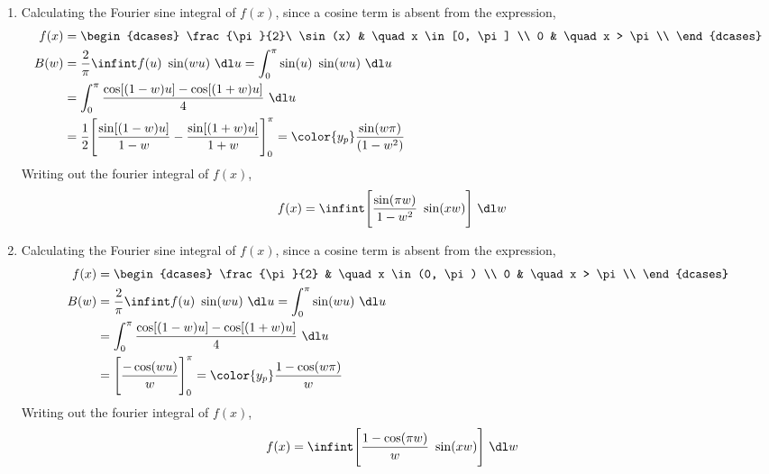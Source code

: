 \begin{enumerate}
    \item Calculating the Fourier sine integral of $ f(x) $, since a cosine term is
          absent from the expression,
          \begin{align}
              f(x) & = \begin{dcases}
                           \frac{\pi}{2}\ \sin(x) & \quad x \in [0, \pi] \\
                           0                      & \quad x > \pi        \\
                       \end{dcases}               \\
              B(w) & = \frac{2}{\pi} \infint f(u)\ \sin(wu)\ \dl u
              = \int_{0}^{\pi} \sin(u)\ \sin(wu)\ \dl u                            \\
                   & = \int_{0}^{\pi} \frac{\cos[(1-w)u] - \cos[(1+w)u]}{4}\ \dl u \\
                   & = \frac{1}{2} \Bigg[ \frac{\sin[(1-w)u]}{1-w}
                  - \frac{\sin[(1+w)u]}{1+w} \Bigg]_0^\pi
              = \color{y_p} \frac{\sin(w\pi)}{(1-w^2)}
          \end{align}
          Writing out the fourier integral of $ f(x) $,
          \begin{align}
              f(x) & = \infint \Bigg[ \frac{\sin(\pi w)}{1 - w^2}\ \sin(xw)
                  \Bigg]\ \dl w
          \end{align}

    \item Calculating the Fourier sine integral of $ f(x) $, since a cosine term is
          absent from the expression,
          \begin{align}
              f(x) & = \begin{dcases}
                           \frac{\pi}{2} & \quad x \in (0, \pi) \\
                           0             & \quad x > \pi        \\
                       \end{dcases}                        \\
              B(w) & = \frac{2}{\pi} \infint f(u)\ \sin(wu)\ \dl u
              = \int_{0}^{\pi} \sin(wu)\ \dl u                                     \\
                   & = \int_{0}^{\pi} \frac{\cos[(1-w)u] - \cos[(1+w)u]}{4}\ \dl u \\
                   & = \Bigg[  \frac{-\cos(wu)}{w} \Bigg]_0^\pi
              = \color{y_p} \frac{1 - \cos(w\pi)}{w}
          \end{align}
          Writing out the fourier integral of $ f(x) $,
          \begin{align}
              f(x) & = \infint \Bigg[ \frac{1 - \cos(\pi w)}{w}\ \sin(xw)
                  \Bigg]\ \dl w
          \end{align}


\end{enumerate}
